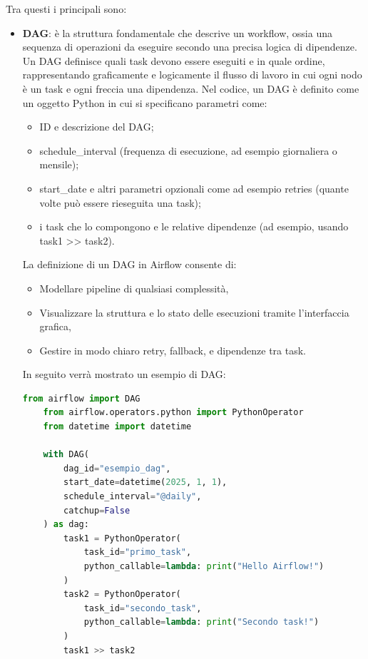 Tra questi i principali sono:
\begin{itemize}
    \item \textbf{DAG}: è la struttura fondamentale che descrive un workflow, ossia una sequenza di operazioni da eseguire secondo una precisa logica di dipendenze.
    Un DAG definisce quali task devono essere eseguiti e in quale ordine, rappresentando graficamente e logicamente il flusso di lavoro in cui ogni nodo è un task e ogni freccia una dipendenza. 
    Nel codice, un DAG è definito come un oggetto Python in cui si specificano parametri come:
    \begin{itemize}
        \item ID e descrizione del DAG;
        \item schedule\_interval (frequenza di esecuzione, ad esempio giornaliera o mensile);
        \item start\_date e altri parametri opzionali come ad esempio retries (quante volte può essere rieseguita una task);
        \item i task che lo compongono e le relative dipendenze (ad esempio, usando task1 >> task2).
    \end{itemize}
    
    La definizione di un DAG in Airflow consente di:
    \begin{itemize}
        \item Modellare pipeline di qualsiasi complessità,
        \item Visualizzare la struttura e lo stato delle esecuzioni tramite l'interfaccia grafica,
        \item Gestire in modo chiaro retry, fallback, e dipendenze tra task.
    \end{itemize}
    
    In seguito verrà mostrato un esempio di DAG:
    
    \begin{lstlisting}[language=Python]
    from airflow import DAG
    from airflow.operators.python import PythonOperator
    from datetime import datetime

    with DAG(
        dag_id="esempio_dag",
        start_date=datetime(2025, 1, 1),
        schedule_interval="@daily",
        catchup=False
    ) as dag:
        task1 = PythonOperator(
            task_id="primo_task",
            python_callable=lambda: print("Hello Airflow!")
        )
        task2 = PythonOperator(
            task_id="secondo_task",
            python_callable=lambda: print("Secondo task!")
        )
        task1 >> task2
    \end{lstlisting}
    

\end{itemize}
